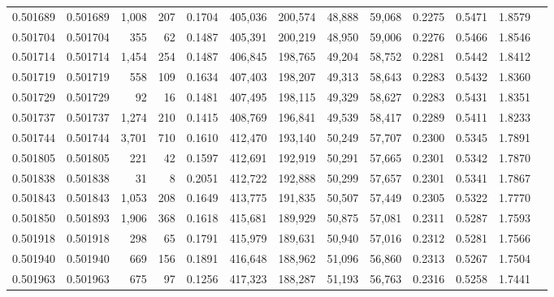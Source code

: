 \begin{tabular}{rrrrrrrrrrrrr}
0.501689 & 0.501689 & 1,008 &   207 &                                     0.1704 & 405,036 & 200,574 &  48,888 &  59,068 & 0.2275 & 0.5471 & 1.8579 \\
0.501704 & 0.501704 &   355 &    62 &                                     0.1487 & 405,391 & 200,219 &  48,950 &  59,006 & 0.2276 & 0.5466 & 1.8546 \\
0.501714 & 0.501714 & 1,454 &   254 &                                     0.1487 & 406,845 & 198,765 &  49,204 &  58,752 & 0.2281 & 0.5442 & 1.8412 \\
0.501719 & 0.501719 &   558 &   109 &                                     0.1634 & 407,403 & 198,207 &  49,313 &  58,643 & 0.2283 & 0.5432 & 1.8360 \\
0.501729 & 0.501729 &    92 &    16 &                                     0.1481 & 407,495 & 198,115 &  49,329 &  58,627 & 0.2283 & 0.5431 & 1.8351 \\
0.501737 & 0.501737 & 1,274 &   210 &                                     0.1415 & 408,769 & 196,841 &  49,539 &  58,417 & 0.2289 & 0.5411 & 1.8233 \\
0.501744 & 0.501744 & 3,701 &   710 &                                     0.1610 & 412,470 & 193,140 &  50,249 &  57,707 & 0.2300 & 0.5345 & 1.7891 \\
0.501805 & 0.501805 &   221 &    42 &                                     0.1597 & 412,691 & 192,919 &  50,291 &  57,665 & 0.2301 & 0.5342 & 1.7870 \\
0.501838 & 0.501838 &    31 &     8 &                                     0.2051 & 412,722 & 192,888 &  50,299 &  57,657 & 0.2301 & 0.5341 & 1.7867 \\
0.501843 & 0.501843 & 1,053 &   208 &                                     0.1649 & 413,775 & 191,835 &  50,507 &  57,449 & 0.2305 & 0.5322 & 1.7770 \\
0.501850 & 0.501893 & 1,906 &   368 &                                     0.1618 & 415,681 & 189,929 &  50,875 &  57,081 & 0.2311 & 0.5287 & 1.7593 \\
0.501918 & 0.501918 &   298 &    65 &                                     0.1791 & 415,979 & 189,631 &  50,940 &  57,016 & 0.2312 & 0.5281 & 1.7566 \\
0.501940 & 0.501940 &   669 &   156 &                                     0.1891 & 416,648 & 188,962 &  51,096 &  56,860 & 0.2313 & 0.5267 & 1.7504 \\
0.501963 & 0.501963 &   675 &    97 &                                     0.1256 & 417,323 & 188,287 &  51,193 &  56,763 & 0.2316 & 0.5258 & 1.7441 \\

\end{tabular}
